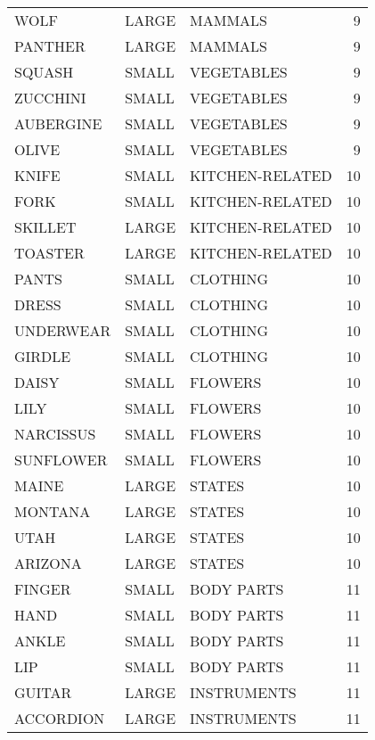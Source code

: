 \begin{tabular}{lllr}
        WOLF & LARGE &          MAMMALS &        9 \\
     PANTHER & LARGE &          MAMMALS &        9 \\
      SQUASH & SMALL &       VEGETABLES &        9 \\
    ZUCCHINI & SMALL &       VEGETABLES &        9 \\
   AUBERGINE & SMALL &       VEGETABLES &        9 \\
       OLIVE & SMALL &       VEGETABLES &        9 \\
       KNIFE & SMALL &  KITCHEN-RELATED &       10 \\
        FORK & SMALL &  KITCHEN-RELATED &       10 \\
     SKILLET & LARGE &  KITCHEN-RELATED &       10 \\
     TOASTER & LARGE &  KITCHEN-RELATED &       10 \\
       PANTS & SMALL &         CLOTHING &       10 \\
       DRESS & SMALL &         CLOTHING &       10 \\
   UNDERWEAR & SMALL &         CLOTHING &       10 \\
      GIRDLE & SMALL &         CLOTHING &       10 \\
       DAISY & SMALL &          FLOWERS &       10 \\
        LILY & SMALL &          FLOWERS &       10 \\
   NARCISSUS & SMALL &          FLOWERS &       10 \\
   SUNFLOWER & SMALL &          FLOWERS &       10 \\
       MAINE & LARGE &           STATES &       10 \\
     MONTANA & LARGE &           STATES &       10 \\
        UTAH & LARGE &           STATES &       10 \\
     ARIZONA & LARGE &           STATES &       10 \\
      FINGER & SMALL &       BODY PARTS &       11 \\
        HAND & SMALL &       BODY PARTS &       11 \\
       ANKLE & SMALL &       BODY PARTS &       11 \\
         LIP & SMALL &       BODY PARTS &       11 \\
      GUITAR & LARGE &      INSTRUMENTS &       11 \\
   ACCORDION & LARGE &      INSTRUMENTS &       11 \\

\end{tabular}
